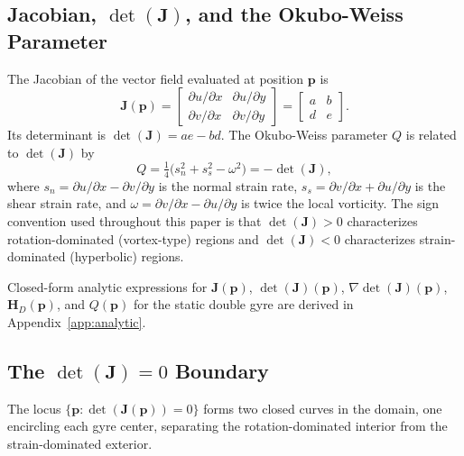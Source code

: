 \documentclass[lettersize,journal]{IEEEtran}
\begin{document}
\subsection{Jacobian, $\det(\mathbf{J})$, and the Okubo-Weiss Parameter}

The Jacobian of the vector field evaluated at position $\mathbf{p}$ is
\begin{equation}
    \mathbf{J}(\mathbf{p}) =
    \begin{bmatrix}
        \partial u / \partial x & \partial u / \partial y \\
        \partial v / \partial x & \partial v / \partial y
    \end{bmatrix}
    =
    \begin{bmatrix} a & b \\ d & e \end{bmatrix}. \label{eq:jacobian}
\end{equation}
Its determinant is $\det(\mathbf{J}) = ae - bd$. The Okubo-Weiss parameter $Q$
is related to $\det(\mathbf{J})$ by
\begin{equation}
    Q = \tfrac{1}{4}\bigl(s_n^2 + s_s^2 - \omega^2\bigr) = -\det(\mathbf{J}),
    \label{eq:okubo_weiss}
\end{equation}
where $s_n = \partial u/\partial x - \partial v / \partial y$ is the normal strain
rate, $s_s = \partial v / \partial x + \partial u / \partial y$ is the shear
strain rate, and $\omega = \partial v/\partial x - \partial u/\partial y$ is
twice the local vorticity. The sign convention used throughout this paper is
that $\det(\mathbf{J}) > 0$ characterizes rotation-dominated (vortex-type)
regions and $\det(\mathbf{J}) < 0$ characterizes strain-dominated (hyperbolic)
regions.

Closed-form analytic expressions for $\mathbf{J}(\mathbf{p})$,
$\det(\mathbf{J})(\mathbf{p})$, $\nabla \det(\mathbf{J})(\mathbf{p})$,
$\mathbf{H}_D(\mathbf{p})$, and $Q(\mathbf{p})$ for the static double gyre are
derived in Appendix~\ref{app:analytic}.

\subsection{The $\det(\mathbf{J}) = 0$ Boundary}

The locus $\{\mathbf{p} : \det(\mathbf{J}(\mathbf{p})) = 0\}$ forms two closed
curves in the domain, one encircling each gyre center, separating the
rotation-dominated interior from the strain-dominated exterior.
\end{document}
